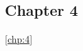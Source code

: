 \documentclass[../Dissertation]{subfiles}
\begin{document}
\subsection{Chapter 4}\label{subsec:summary_chp4}
    \lipsum[64] \cref{chp:4} \lipsum[64]
\end{document}
